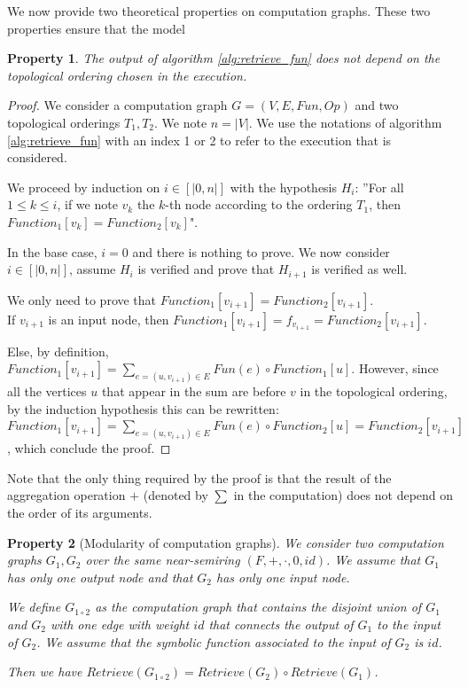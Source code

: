 \documentclass[11pt,a4paper]{article}
\newcommand{\Sum}[2]{\overset{#2}{\underset{#1}{\sum}}}
\newtheorem{property}{Property}
\theoremstyle{definition}
\renewcommand{\leq}{\leqslant}
\begin{document}
We now provide two theoretical properties on computation graphs. These two properties ensure that the model 

\begin{property}
\label{prop:topological_ordering}
	The output of algorithm \ref{alg:retrieve_fun} does not depend on the topological ordering chosen in the execution.
\end{property}

\begin{proof}

	We consider a computation graph $G = (V,E,Fun,Op)$ and two topological orderings $T_1 ,T_2$. We note $n = |V|$. We use the notations of algorithm \ref{alg:retrieve_fun} with an index 1 or 2 to refer to the execution that is considered.
	
	 We proceed by induction on $i \in [|0,n|]$ with the hypothesis $H_i$: ''For all $1 \leq k \leq i$, if we note $v_k$ the $k$-th node according to the ordering $T_1$, then $Function_1[v_k]=Function_2[v_k]$".
	 
	 In the base case, $i=0$ and there is nothing to prove. We now consider $i \in [|0,n|]$, assume $H_i$ is verified and prove that $H_{i+1}$ is verified as well.
	 
	 We only need to prove that $Function_1[v_{i+1}]=Function_2[v_{i+1}]$.\\
	 
	 If $v_{i+1}$ is an input node, then $Function_1[v_{i+1}]=f_{v_{i+1}}=Function_2[v_{i+1}]$.
	 
	 Else, by definition, $Function_1[v_{i+1}]=\Sum{e=(u,v_{i+1}) \in E}{} Fun(e) \circ Function_1[u]$. However, since all the vertices $u$ that appear in the sum are before $v$ in the topological ordering, by the induction hypothesis this can be rewritten: $Function_1[v_{i+1}]=\Sum{e=(u,v_{i+1}) \in E}{} Fun(e) \circ Function_2[u]=Function_2[v_{i+1}]$, which conclude the proof.
\end{proof}

Note that the only thing required by the proof is that the result of the aggregation operation $+$ (denoted by $\sum$ in the computation) does not depend on the order of its arguments.\\

\begin{property}[Modularity of computation graphs]
	We consider two computation graphs $G_1,G_2$ over the same near-semiring $(F,+,\cdot,0,id)$. We assume that $G_1$ has only one output node and that $G_2$ has only one input node. 
	
	We define $G_{1 \circ 2}$ as the computation graph that contains the disjoint union of $G_1$ and $G_2$ with one edge with weight $id$ that connects the output of $G_1$ to the input of $G_2$. We assume that the symbolic function associated to the input of $G_2$ is $id$.
	
	Then we have $Retrieve(G_{1 \circ 2}) = Retrieve(G_2) \circ Retrieve(G_1)$.
\end{property}
\end{document}
